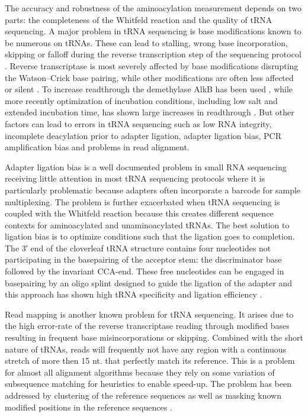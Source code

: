 \documentclass[9pt,lineno]{elife}
\begin{document}
The accuracy and robustness of the aminoacylation measurement depends on two parts: the completeness of the Whitfeld reaction and the quality of tRNA sequencing.
A major problem in tRNA sequencing is base modifications known to be numerous on tRNAs.
These can lead to stalling, wrong base incorporation, skipping or falloff during the reverse transcription step of the sequencing protocol \citep{Motorin2007-nb}.
Reverse transcriptase is most severely affected by base modifications disrupting the Watson–Crick base pairing, while other modifications are often less affected or silent \citep{Wang2021-fc}.
To increase readthrough the demethylase AlkB has been used \citep{Zheng2015-kj}, while more recently optimization of incubation conditions, including low salt and extended incubation time, has shown large increases in readthrough \citep{Behrens2021-gb}.
But other factors can lead to errors in tRNA sequencing such as low RNA integrity, incomplete deacylation prior to adapter ligation, adapter ligation bias, PCR amplification bias and problems in read alignment.

Adapter ligation bias is a well documented problem in small RNA sequencing \citep{Fuchs2015-nb, Zhuang2012-nu} receiving little attention in most tRNA sequencing protocols where it is particularly problematic because adapters often incorporate a barcode for sample multiplexing.
The problem is further exacerbated when tRNA sequencing is coupled with the Whitfeld reaction because this creates different sequence contexts for aminoacylated and unaminoacylated tRNAs.
The best solution to ligation bias is to optimize conditions such that the ligation goes to completion.
The 3′ end of the cloverleaf tRNA structure contains four nucleotides not participating in the basepairing of the acceptor stem: the discriminator base followed by the invariant CCA-end.
These free nucleotides can be engaged in basepairing by an oligo splint designed to guide the ligation of the adapter and this approach has shown high tRNA specificity and ligation efficiency \cite{Shigematsu2017-tv, Smith2015-ht}.

Read mapping is another known problem for tRNA sequencing.
It arises due to the high error-rate of the reverse transcriptase reading through modified bases resulting in frequent base misincorporations or skipping.
Combined with the short nature of tRNAs, reads will frequently not have any region with a continuous stretch of more then 15 nt. that perfectly match its reference.
This is a problem for almost all alignment algorithms because they rely on some variation of subsequence matching for heuristics to enable speed-up.
The problem has been addressed by clustering of the reference sequences \citep{Hoffmann2018-uz} as well as masking known modified positions in the reference sequences \citep{Behrens2021-gb}.
\end{document}

